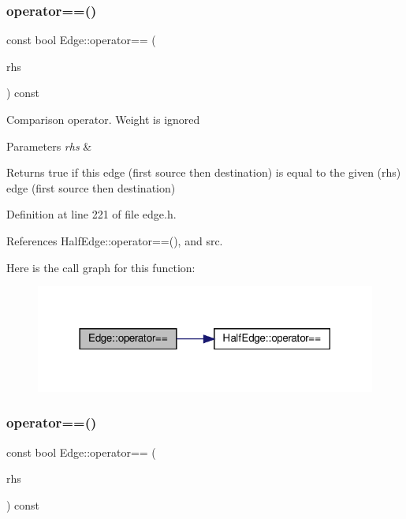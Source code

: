 \subsubsection{\texorpdfstring{operator==()}{operator==()}\hspace{0.1cm}{\footnotesize\ttfamily [1/2]}}
{\footnotesize\ttfamily const bool Edge\+::operator== (\begin{DoxyParamCaption}\item[{const \hyperlink{classEdge}{Edge} \&}]{rhs }\end{DoxyParamCaption}) const\hspace{0.3cm}{\ttfamily [inline]}}

Comparison operator. Weight is ignored 
\begin{DoxyParams}{Parameters}
{\em rhs} & \\
\hline
\end{DoxyParams}
\begin{DoxyReturn}{Returns}
true if this edge (first source then destination) is equal to the given (rhs) edge (first source then destination) 
\end{DoxyReturn}


Definition at line 221 of file edge.\+h.



References Half\+Edge\+::operator==(), and src.

Here is the call graph for this function\+:
\nopagebreak
\begin{figure}[H]
\begin{center}
\leavevmode
\includegraphics[width=318pt]{classEdge_abe84b58ced477ebeef5078e4cb48b49f_cgraph}
\end{center}
\end{figure}
\mbox{\label{classEdge_aa05a0ee020bc6c31ed604c2d4bed8319}} 
\subsubsection{\texorpdfstring{operator==()}{operator==()}\hspace{0.1cm}{\footnotesize\ttfamily [2/2]}}
{\footnotesize\ttfamily const bool Edge\+::operator== (\begin{DoxyParamCaption}\item[{const \hyperlink{edge_8h_a5fbd20c46956d479cb10afc9855223f6}{type\+Vertex} \&}]{rhs }\end{DoxyParamCaption}) const\hspace{0.3cm}{\ttfamily [inline]}}

